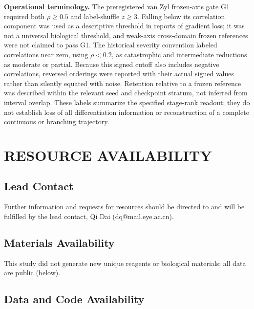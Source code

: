 \documentclass[12pt,letterpaper]{article}
\begin{document}
\textbf{Operational terminology.} The preregistered van Zyl frozen-axis gate G1 required both $\rho\ge0.5$ and label-shuffle $z\ge3$. Falling below its correlation component was used as a descriptive threshold in reports of gradient loss; it was not a universal biological threshold, and weak-axis cross-domain frozen references were not claimed to pass G1. The historical severity convention labeled correlations near zero, using $\rho<0.2$, as catastrophic and intermediate reductions as moderate or partial. Because this signed cutoff also includes negative correlations, reversed orderings were reported with their actual signed values rather than silently equated with noise. Retention relative to a frozen reference was described within the relevant seed and checkpoint stratum, not inferred from interval overlap. These labels summarize the specified stage-rank readout; they do not establish loss of all differentiation information or reconstruction of a complete continuous or branching trajectory.

\section*{RESOURCE AVAILABILITY}

\subsection*{Lead Contact}

Further information and requests for resources should be directed to and will be fulfilled by the lead contact, Qi Dai (dq@mail.eye.ac.cn).

\subsection*{Materials Availability}

This study did not generate new unique reagents or biological materials; all data are public (below).

\subsection*{Data and Code Availability}
\end{document}
